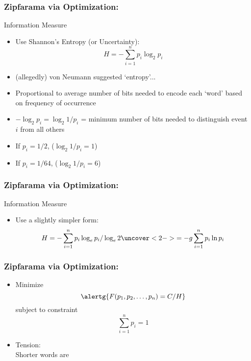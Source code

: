 \begin{frame}
  \frametitle{Zipfarama via Optimization:}

  \begin{block}{Information Measure}
    \begin{itemize}
    \item<1-> Use Shannon's Entropy (or Uncertainty): 
      $$ 
      H = -\sum_{i=1}^n p_i \log_2 p_i
      $$
    \item<2-> (allegedly) von Neumann suggested `entropy'...
    \item<3-> Proportional to average number of bits needed to encode each `word'
      based on frequency of occurrence
    \item<4-> $-\log_2 p_i = \log_2 1/p_i$ = minimum number
      of bits needed to distinguish event $i$ from all others
    \item<5-> If $p_i = 1/2$,  ($\log_{2} 1/p_i = 1$)
    \item<6-> If $p_i = 1/64$,  ($\log_{2} 1/p_i = 6$)
    \end{itemize}
  \end{block}

\end{frame}

\begin{frame}
  \frametitle{Zipfarama via Optimization:}

  \begin{block}{Information Measure}
    \begin{itemize}
    \item<1->       
      Use a slightly simpler form:
      $$ 
      H = -\sum_{i=1}^n p_i \log_e {p_i}/\log_e{2} 
      \uncover<2->{= -g \sum_{i=1}^n p_i \ln p_i}
      $$
    \end{itemize}
  \end{block}

\end{frame}


\begin{frame}
  \frametitle{Zipfarama via Optimization:}

  \begin{block}{}
  \begin{itemize}
  \item<1-> Minimize 
    $$ \alertg{F(p_1,p_2,\ldots,p_n) = C/H} $$
    subject to constraint
    $$ \sum_{i=1}^n p_i = 1 $$
  \item<2-> Tension: \\
     Shorter words are \\
  \end{itemize}
  \end{block}

\end{frame}


